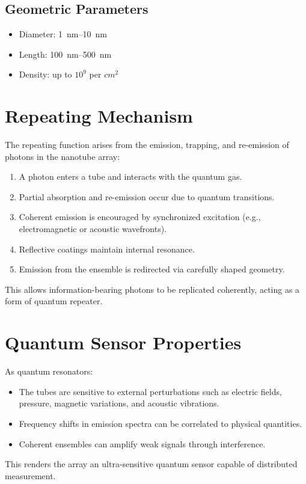\documentclass[11pt]{article}
\begin{document}
	\subsection{Geometric Parameters}
	\begin{itemize}
		\item Diameter: \SIrange{1}{10}{\nano\meter}
		\item Length: \SIrange{100}{500}{\nano\meter}
		\item Density: up to $10^9$ per $\si{cm^2}$
	\end{itemize}
	
	\section{Repeating Mechanism}
	The repeating function arises from the emission, trapping, and re-emission of photons in the nanotube array:
	\begin{enumerate}
		\item A photon enters a tube and interacts with the quantum gas.
		\item Partial absorption and re-emission occur due to quantum transitions.
		\item Coherent emission is encouraged by synchronized excitation (e.g., electromagnetic or acoustic wavefronts).
		\item Reflective coatings maintain internal resonance.
		\item Emission from the ensemble is redirected via carefully shaped geometry.
	\end{enumerate}
	This allows information-bearing photons to be replicated coherently, acting as a form of quantum repeater.
	
	\section{Quantum Sensor Properties}
	As quantum resonators:
	\begin{itemize}
		\item The tubes are sensitive to external perturbations such as electric fields, pressure, magnetic variations, and acoustic vibrations.
		\item Frequency shifts in emission spectra can be correlated to physical quantities.
		\item Coherent ensembles can amplify weak signals through interference.
	\end{itemize}
	This renders the array an ultra-sensitive quantum sensor capable of distributed measurement.
	
\end{document}
